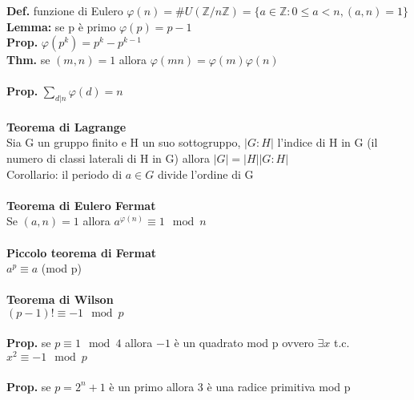 \documentclass[10pt,a4paper]{article}
\begin{document}
\textbf{Def.} funzione di Eulero
$\varphi (n) = \#U(\mathbb{Z}/n\mathbb{Z}) = \{a \in \mathbb{Z}: 0 \leq a < n,(a,n)=1\}$\\
\textbf{Lemma:} se p è primo $\varphi(p)=p-1$\\
\textbf{Prop.} $\varphi(p^k) = p^k-p^{k-1}$\\
\textbf{Thm.} se $(m,n)=1$ allora $\varphi(mn)= \varphi(m)\varphi(n)$\\\\
\textbf{Prop.} $\sum_{d|n}\varphi(d) =n$\\\\
\textbf{Teorema di Lagrange}\\
Sia G un gruppo finito e H un suo sottogruppo, $|G:H|$ l'indice di H in G (il numero di classi laterali di H in G) allora $|G| = |H| |G:H|$\\
Corollario: il periodo di $a \in G$ divide l'ordine di G\\\\
\textbf{Teorema di Eulero Fermat}\\
Se $(a,n)=1$ allora $a^{\varphi(n)} \equiv 1 \mod n$\\\\
\textbf{Piccolo teorema di Fermat}\\
$a^{p} \equiv a$ (mod p)\\\\
\textbf{Teorema di Wilson}\\
$(p-1)! \equiv -1 \mod p$\\\\
\textbf{Prop.} se $p \equiv 1 \mod 4$ allora $-1$ è un quadrato mod p ovvero $\exists x$ t.c. $x^2 \equiv -1 \mod p$\\\\
\textbf{Prop.} se $p=2^n+1$ è un primo allora 3 è una radice primitiva mod p\\
\end{document}
